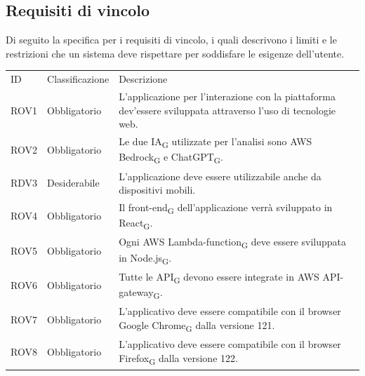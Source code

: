\documentclass{article}
\begin{document}
\subsection{Requisiti di vincolo}
Di seguito la specifica per i requisiti di vincolo, i quali descrivono i limiti e le restrizioni che un sistema
deve rispettare per soddisfare le esigenze dell'utente.
\begin{center}

    \begin{tabular}{|p{3cm}|p{3cm}|p{6cm}|}
    \rowcolor{Blue} 
\hline
ID & Classificazione & Descrizione \\ 
\rowcolor{LightBlue}
\hline
ROV1& Obbligatorio & L'applicazione per l'interazione con la piattaforma dev'essere sviluppata attraverso l'uso di tecnologie web.\\ 
\hline
\rowcolor{LighterBlue}
ROV2& Obbligatorio & Le due IA\textsubscript{G} utilizzate per l'analisi sono AWS Bedrock\textsubscript{G} e ChatGPT\textsubscript{G}. \\ 
\rowcolor{LightBlue}
\hline
RDV3& Desiderabile & L'applicazione deve essere utilizzabile anche da dispositivi mobili.\\
\hline
\rowcolor{LighterBlue}

ROV4& Obbligatorio & Il front-end\textsubscript{G} dell'applicazione verrà sviluppato in React\textsubscript{G}.\\
\rowcolor{LightBlue}
\hline
ROV5& Obbligatorio & Ogni AWS Lambda-function\textsubscript{G} deve essere sviluppata in Node.js\textsubscript{G}.\\
\hline
\rowcolor{LighterBlue}

ROV6& Obbligatorio & Tutte le API\textsubscript{G} devono essere integrate in AWS API-gateway\textsubscript{G}.\\
\hline
\rowcolor{LightBlue}
ROV7& Obbligatorio & L'applicativo deve essere compatibile con il browser Google Chrome\textsubscript{G} dalla versione 121.\\
\hline
\rowcolor{LighterBlue}
ROV8& Obbligatorio & L'applicativo deve essere compatibile con il browser Firefox\textsubscript{G} dalla versione 122.\\
\hline
\end{tabular}
\end{center}
\end{document}
